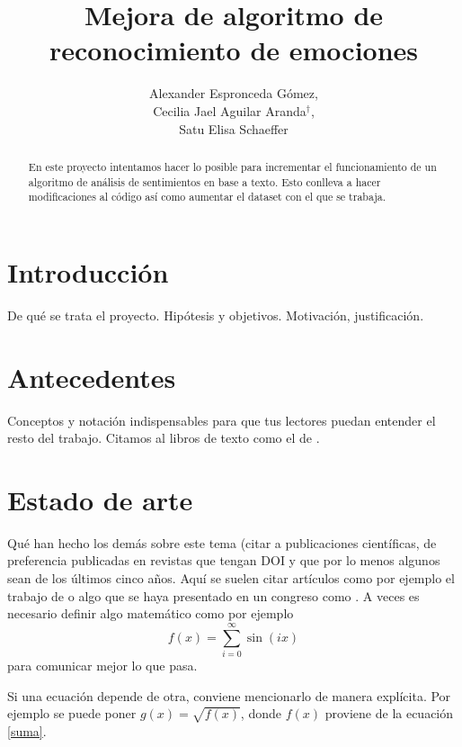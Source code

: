 \documentclass[a4]{sciposter}
\title{Mejora de algoritmo de\\reconocimiento de emociones}
\author{Alexander Espronceda Gómez,\\Cecilia Jael Aguilar Aranda$^\dagger$,\\Satu Elisa Schaeffer}
\institute {Posgrado en Ingeniería de Sistemas}
\begin{document}

\maketitle

\begin{abstract}
En este proyecto intentamos hacer lo posible para incrementar el funcionamiento de un algoritmo de análisis de sentimientos en base a texto. Esto conlleva a hacer modificaciones al código así como aumentar el dataset con el que se trabaja.
\end{abstract}

\begin{multicols}{2} 

\section{Introducción}

De qué se trata el proyecto. Hipótesis y objetivos. Motivación, justificación.

\section{Antecedentes}

Conceptos y notación indispensables para que tus lectores puedan
entender el resto del trabajo. Citamos al libros de texto como el de
\citet{ai}.

\section{Estado de arte}

Qué han hecho los demás sobre este tema (citar a publicaciones
científicas, de preferencia publicadas en revistas que tengan DOI y
que por lo menos algunos sean de los últimos cinco años. Aquí se
suelen citar artículos como por ejemplo el trabajo de \citet{elisa} o
algo que se haya presentado en un congreso como \citet{ar}. A veces es
necesario definir algo matemático como por ejemplo
\begin{equation}
    f(x) = \sum_{i = 0}^\infty \sin(i x)
    \label{suma}
\end{equation}
para comunicar mejor lo que pasa.

Si una ecuación depende de otra, conviene mencionarlo de manera
explícita. Por ejemplo se puede poner $g(x) = \sqrt{f(x)}$, donde
$f(x)$ proviene de la ecuación \eqref{suma}.


\end{multicols}
\end{document}

